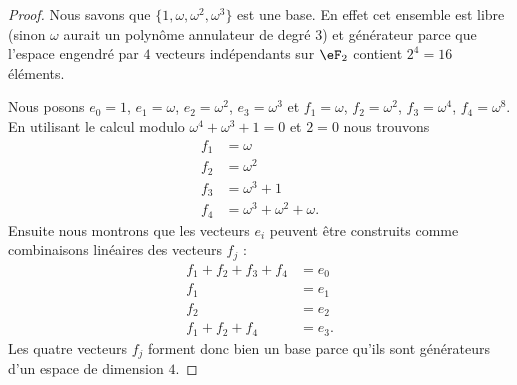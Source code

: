 \begin{proof}
    Nous savons que \( \{ 1,\omega,\omega^2,\omega^3 \}\) est une base. En effet cet ensemble est libre (sinon \( \omega\) aurait un polynôme annulateur de degré \( 3\)) et générateur parce que l'espace engendré par \( 4\) vecteurs indépendants sur \( \eF_2\) contient \( 2^4=16\) éléments.

    Nous posons \( e_0=1\), \( e_1=\omega\), \( e_2=\omega^2\), \( e_3=\omega^3\) et \( f_1=\omega\), \( f_2=\omega^2\), \( f_3=\omega^4\), \( f_4=\omega^8\). En utilisant le calcul modulo \( \omega^4+\omega^3+1=0\) et \( 2=0\) nous trouvons
    \begin{subequations}
        \begin{align}
            f_1&=\omega\\
            f_2&=\omega^2\\
            f_3&=\omega^3+1\\
            f_4&=\omega^3+\omega^2+\omega.
        \end{align}
    \end{subequations}
    Ensuite nous montrons que les vecteurs \( e_i\) peuvent être construits comme combinaisons linéaires des vecteurs \( f_j\) :
    \begin{subequations}
        \begin{align}
            f_1+f_2+f_3+f_4&=e_0\\
            f_1&=e_1\\
            f_2&=e_2\\
            f_1+f_2+f_4&=e_3.
        \end{align}
    \end{subequations}
    Les quatre vecteurs \( f_j\) forment donc bien un base parce qu'ils sont générateurs d'un espace de dimension \( 4\).
\end{proof}

